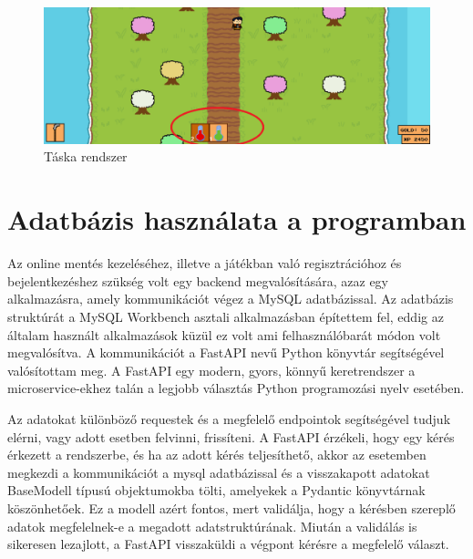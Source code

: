 \begin{figure}[H]
    \centering
    \includegraphics[width=15.5truecm]{images/inventory.png}
    \caption{Táska rendszer}
    \label{fig:Táska rendszer}
\end{figure}


\section{Adatbázis használata a programban}

 Az online mentés kezeléséhez, illetve a játékban való regisztrációhoz és bejelentkezéshez szükség volt egy backend megvalósítására, azaz egy alkalmazásra, amely kommunikációt végez a MySQL \cite{mysql} adatbázissal. Az adatbázis struktúrát a MySQL Workbench \cite{mysql-workbench} asztali alkalmazásban építettem fel, eddig az általam használt alkalmazások küzül ez volt ami felhasználóbarát módon volt megvalósítva.  A kommunikációt a FastAPI \cite{fastapi} nevű Python könyvtár segítségével valósítottam meg. A FastAPI egy modern, gyors, könnyű keretrendszer a microservice-ekhez talán a legjobb választás Python programozási nyelv esetében.

Az adatokat különböző requestek és a megfelelő endpointok segítségével tudjuk elérni, vagy adott esetben felvinni, frissíteni.
 A FastAPI érzékeli, hogy egy kérés érkezett a rendszerbe, és ha az adott kérés teljesíthető,
  akkor az esetemben megkezdi a kommunikációt a mysql adatbázissal és a visszakapott adatokat BaseModell \cite{basemodell} típusú objektumokba tölti,
   amelyekek a Pydantic \cite{pydantic} könyvtárnak köszönhetőek. Ez a modell azért fontos, mert validálja,
    hogy a kérésben szereplő adatok megfelelnek-e a megadott adatstruktúrának.
     Miután a validálás is sikeresen lezajlott, a FastAPI visszaküldi a végpont kérésre a megfelelő választ.

